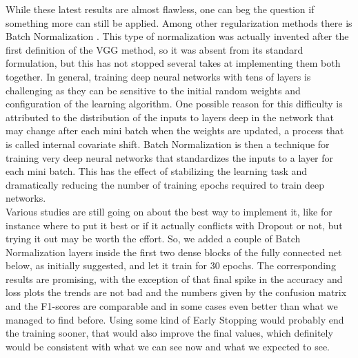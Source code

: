 \documentclass[12pt,a4paper]{report}
\begin{document}
While these latest results are almost flawless, one can beg the question if something more can still be applied. Among other regularization methods there is Batch Normalization \cite{batch_normalization}. This type of normalization was actually invented after the first 
definition of the VGG method, so it was absent from its standard formulation, but this has not stopped several takes at implementing them both together. In general, training deep neural networks with tens of layers is challenging as they can be sensitive to the initial random weights and configuration of the learning algorithm. One possible reason for this difficulty is attributed to the distribution of the inputs to layers deep in the network that may change after each mini batch when the weights are updated, a process that is called internal covariate shift. Batch Normalization is then a technique for training very deep neural networks that standardizes the inputs to a layer for each mini batch. This has the effect of stabilizing the learning task and dramatically reducing the number of training epochs required to train deep networks. \\
Various studies are still going on about the best way to implement it, like for instance where to put it best or if it actually conflicts with Dropout or not, but trying it out may be worth the effort. So, we added a couple of Batch Normalization layers inside the first two dense blocks of the fully connected net below, as initially suggested, and let it train for 30 epochs. The corresponding results are promising, with the exception of that final spike in the accuracy and loss plots the trends are not bad and the numbers given by the confusion matrix and the F1-scores are comparable and in some cases even better than what we managed to find before. Using some kind of Early Stopping would probably end the training sooner, that would also improve the final values, which definitely would be consistent with what we can see now and what we expected to see.
\end{document}
